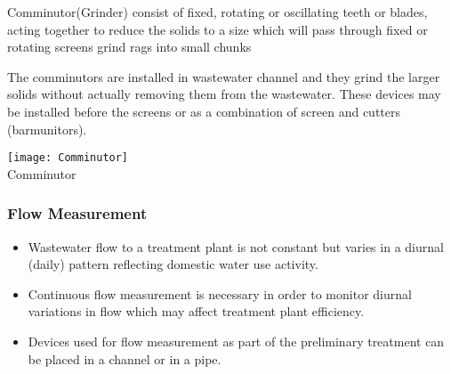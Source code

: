 					\begin{itemize}
\begin{minipage}{\textwidth}	\item Comminutor(Grinder) consist of fixed, rotating or oscillating teeth or blades, acting together to reduce the solids to a size which will pass through fixed or rotating screens grind rags into small chunks
\item The comminutors are installed in wastewater channel and they grind the larger solids without actually removing them from the wastewater.  These devices may be installed before the screens or as a combination of screen and cutters (barmunitors).
					\end{minipage}	
					\end{itemize}
					\begin{minipage}{\textwidth}
					\begin{center}
      \texttt{[image: Comminutor]}\\
      Comminutor\\
\end{center}
    \end{minipage}
  
		\subsubsection{Flow Measurement}
					\begin{itemize}
						\item Wastewater flow to a treatment plant is not constant but varies in a diurnal (daily) pattern reflecting domestic water use activity.
						\item Continuous flow measurement is necessary in order to monitor diurnal variations in flow which may affect treatment plant efficiency.\\
						\item Devices used for flow measurement as part of the preliminary treatment can be placed in a channel or in a pipe.
					\end{itemize}


